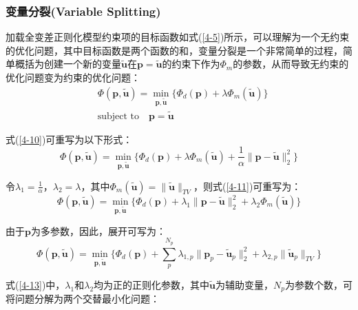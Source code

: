 \documentclass[12pt]{article}
\begin{document}
\subsubsection{变量分裂(Variable Splitting)}
加载全变差正则化模型约束项的目标函数如式(\ref{4-5})所示，可以理解为一个无约束的优化问题，其中目标函数是两个函数的和，变量分裂是一个非常简单的过程，简单概括为创建一个新的变量$\tilde{\boldsymbol{u}}$在$\boldsymbol{p}=\tilde{\boldsymbol{u}}$的约束下作为$\Phi_m$的参数，从而导致无约束的优化问题变为约束的优化问题：
\begin{equation}\label{4-10}
\begin{aligned}
&\Phi(\boldsymbol{p},\tilde{\boldsymbol{u}})=\min_{\boldsymbol{p},\tilde{\boldsymbol{u}}}\{\Phi_d(\boldsymbol{p})+\lambda \Phi_m(\tilde{\boldsymbol{u}})\}\\
&\text{subject to} \quad \boldsymbol{p}=\tilde{\boldsymbol{u}}
\end{aligned}
\end{equation}
\par
式(\ref{4-10})可重写为以下形式：
\begin{equation}\label{4-11}
\Phi(\boldsymbol{p},\tilde{\boldsymbol{u}})=\min_{\boldsymbol{p},\tilde{\boldsymbol{u}}}\{\Phi_d(\boldsymbol{p})+\lambda \Phi_m(\tilde{\boldsymbol{u}})+\frac{1}{\alpha} \parallel \boldsymbol{p}-\tilde{\boldsymbol{u}} \parallel_2^2\}
\end{equation}
\par
令$\lambda_1=\frac{1}{\alpha}$，$\lambda_2=\lambda$，其中$\Phi_m(\tilde{\boldsymbol{u}})=\parallel \tilde{\boldsymbol{u}} \parallel_{TV}$，则式(\ref{4-11})可重写为：
\begin{equation}\label{4-12}
\Phi(\boldsymbol{p},\tilde{\boldsymbol{u}})=\min_{\boldsymbol{p},\tilde{\boldsymbol{u}}}\{\Phi_d(\boldsymbol{p})+\lambda_1 \parallel \boldsymbol{p}-\tilde{\boldsymbol{u}} \parallel_2^2 +\lambda_2 \Phi_m(\tilde{\boldsymbol{u}})\}
\end{equation}
\par
由于$\boldsymbol{p}$为多参数，因此，展开可写为：
\begin{equation}\label{4-13}
\Phi(\boldsymbol{p},\tilde{\boldsymbol{u}})=\min_{\boldsymbol{p},\tilde{\boldsymbol{u}}}\{\Phi_d(\boldsymbol{p})+\sum_p^{N_p}\lambda_{1,p}\parallel \boldsymbol{p}_p-\tilde{\boldsymbol{u}}_p \parallel_2^2+\lambda_{2,p}\parallel \tilde{\boldsymbol{u}}_p \parallel_{TV}\}
\end{equation}
\par
式(\ref{4-13})中，$\lambda_1$和$\lambda_2$均为正的正则化参数，其中$\tilde{\boldsymbol{u}}$为辅助变量，$N_p$为参数个数，可将问题分解为两个交替最小化问题：
\end{document}
